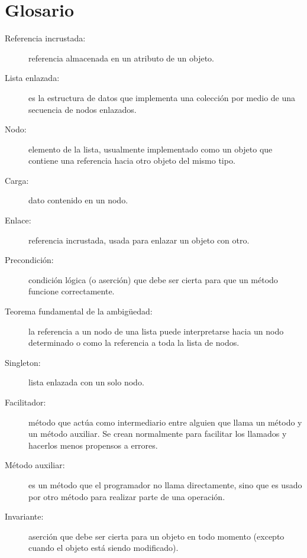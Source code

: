 

\section{Glosario}

\begin{description}

\item[Referencia incrustada:] referencia almacenada en un
 atributo de un objeto.

\item[Lista enlazada:] es la estructura de datos que implementa
una  colección por medio de una secuencia de nodos enlazados.

\item[Nodo:] elemento de la lista, usualmente implementado
como un objeto que contiene una referencia hacia otro objeto
del mismo tipo.

\item[Carga:] dato contenido en un nodo.

\item[Enlace:] referencia incrustada, usada para enlazar un objeto con otro.

\item[Precondición:] condición lógica (o aserción) que debe ser
cierta para que un método funcione correctamente.

\item[Teorema fundamental de la ambigüedad:] la referencia a un nodo de
una lista puede interpretarse hacia un nodo determinado o como la referencia
a toda la lista de nodos.

\item[Singleton:] lista enlazada con un solo nodo.

\item[Facilitador:]  método que actúa como intermediario entre alguien
que llama un método y un método auxiliar. Se crean normalmente para
facilitar los llamados y hacerlos menos propensos a errores.

\item[Método auxiliar:] es un método que el programador no llama directamente, 
sino que es usado por otro método para  realizar parte
de una operación.

\item[Invariante:] aserción que debe ser cierta para un objeto
en todo momento (excepto cuando el objeto está siendo modificado).

\end{description}

